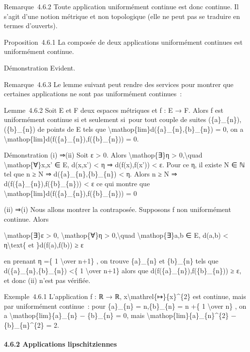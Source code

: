 \documentclass[]{article}
\begin{document}
Remarque~4.6.2 Toute application uniformément continue est donc
continue. Il s'agit d'une notion métrique et non topologique (elle ne
peut pas se traduire en termes d'ouverts).

Proposition~4.6.1 La composée de deux applications uniformément
continues est uniformément continue.

Démonstration Evident.

Remarque~4.6.3 Le lemme suivant peut rendre des services pour montrer
que certaines applications ne sont pas uniformément continues~:

Lemme~4.6.2 Soit E et F deux espaces métriques et f : E → F. Alors f est
uniformément continue si et seulement si~pour tout couple de suites
(\{a\}\_\{n\}),(\{b\}\_\{n\}) de points de E tels que
\textbackslash{}mathop\{lim\}d(\{a\}\_\{n\},\{b\}\_\{n\}) = 0, on a
\textbackslash{}mathop\{lim\}d(f(\{a\}\_\{n\}),f(\{b\}\_\{n\})) = 0.

Démonstration (i) ⇒(ii) Soit ε \textgreater{} 0. Alors
\textbackslash{}mathop\{∃\}η \textgreater{} 0,\textbackslash{}quad
\textbackslash{}mathop\{∀\}x,x' ∈ E, d(x,x') \textless{} η ⇒
d(f(x),f(x')) \textless{} ε. Pour ce η, il existe N ∈ ℕ tel que n ≥ N ⇒
d(\{a\}\_\{n\},\{b\}\_\{n\}) \textless{} η. Alors n ≥ N ⇒
d(f(\{a\}\_\{n\}),f(\{b\}\_\{n\})) \textless{} ε ce qui montre que
\textbackslash{}mathop\{lim\}d(f(\{a\}\_\{n\}),f(\{b\}\_\{n\})) = 0

(ii) ⇒(i) Nous allons montrer la contraposée. Supposons f non
uniformément continue. Alors

\textbackslash{}mathop\{∃\}ε \textgreater{} 0,
\textbackslash{}mathop\{∀\}η \textgreater{} 0,\textbackslash{}quad
\textbackslash{}mathop\{∃\}a,b ∈ E, d(a,b) \textless{}
η\textbackslash{}text\{ et \}d(f(a),f(b)) ≥ ε

en prenant η =\{ 1 \textbackslash{}over n+1\} , on trouve \{a\}\_\{n\}
et \{b\}\_\{n\} tels que d(\{a\}\_\{n\},\{b\}\_\{n\}) \textless{}\{ 1
\textbackslash{}over n+1\} alors que d(f(\{a\}\_\{n\}),f(\{b\}\_\{n\}))
≥ ε, et donc (ii) n'est pas vérifiée.

Exemple~4.6.1 L'application f : ℝ → ℝ,
x\textbackslash{}mathrel\{↦\}\{x\}\^{}\{2\} est continue, mais par
uniformément continue~: pour \{a\}\_\{n\} = n,\{b\}\_\{n\} = n +\{ 1
\textbackslash{}over n\} , on a
\textbackslash{}mathop\{lim\}\textbar{}\{a\}\_\{n\} −
\{b\}\_\{n\}\textbar{} = 0, mais
\textbackslash{}mathop\{lim\}\textbar{}\{a\}\_\{n\}\^{}\{2\} −
\{b\}\_\{n\}\^{}\{2\}\textbar{} = 2.

\paragraph{4.6.2 Applications lipschitziennes}
\end{document}
